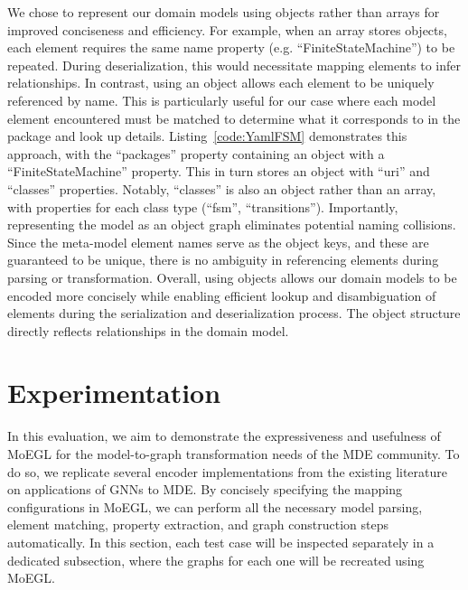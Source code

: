 \documentclass[journal,article,submit,moreauthors,technologies]{Definitions/mdpi}
\begin{document}
We chose to represent our domain models using objects rather than arrays for improved conciseness and efficiency.
For example, when an array stores objects, each element requires the same name property (e.g. ``FiniteStateMachine'') to be repeated. During deserialization, this would necessitate mapping elements to infer relationships. In contrast, using an object allows each element to be uniquely referenced by name. This is particularly useful for our case where each model element encountered must be matched to determine what it corresponds to in the package and look up details. Listing~\ref{code:YamlFSM} demonstrates this approach, with the ``packages'' property containing an object with a ``FiniteStateMachine'' property. This in turn stores an object with ``uri'' and ``classes'' properties. Notably, ``classes'' is also an object rather than an array, with properties for each class type (``fsm'', ``transitions''). Importantly, representing the model as an object graph eliminates potential naming collisions. Since the meta-model element names serve as the object keys, and these are guaranteed to be unique, there is no ambiguity in referencing elements during parsing or transformation. Overall, using objects allows our domain models to be encoded more concisely while enabling efficient lookup and disambiguation of elements during the serialization and deserialization process. The object structure directly reflects relationships in the domain model.

\section{Experimentation} \label{Sec:Experiments}

In this evaluation, we aim to demonstrate the expressiveness and usefulness of MoEGL for the model-to-graph transformation needs of the MDE community.
To do so, we replicate several encoder implementations from the existing literature on applications of GNNs to MDE. By concisely specifying the mapping configurations in MoEGL, we can perform all the necessary model parsing, element matching, property extraction, and graph construction steps automatically. In this section, each test case will be inspected separately in a dedicated subsection, where the graphs for each one will be recreated using MoEGL.
\end{document}
